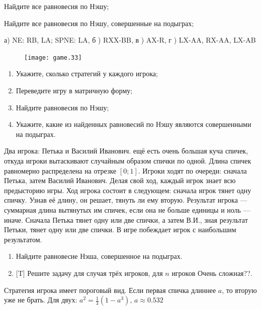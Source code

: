 \begin{problem}
Найдите все равновесия по Нэшу;\par
Найдите все равновесия по Нэшу, совершенные на подыграх;



\begin{sol}
 а)  NE: RB, LA; SPNE: LA, б ) RXX-BB, в ) AX-R, г ) LX-AA, RX-AA, LX-AB
\end{sol}
\end{problem}



\begin{problem}
\begin{figure}[htbp]
     \texttt{[image: game.33]}
\end{figure}\par

\begin{enumerate}
\item  Укажите, сколько стратегий у каждого игрока;\par
\item Переведите игру в матричную форму;\par
\item Найдите равновесия по Нэшу;\par
\item Укажите, какие из найденных равновесий по Нэшу являются совершенными на подыграх.
\end{enumerate}
\begin{sol}
\end{sol}
\end{problem}





\begin{problem}
Два игрока: Петька и Василий Иванович. ещё есть очень большая куча спичек, откуда игроки вытаскивают случайным образом спички по одной. Длина спичек равномерно распределена на отрезке $[0;1]$. Игроки ходят по очереди: сначала Петька, затем Василий Иванович. Делая свой ход, каждый игрок знает всю предысторию игры. Ход игрока состоит в следующем: сначала игрок тянет одну спичку. Узнав её длину, он решает, тянуть ли ему вторую. Результат игрока — суммарная длина вытянутых им спичек, если она не больше единицы и ноль — иначе. Сначала Петька тянет одну или две спички, а затем В.И., зная результат Петьки, тянет одну или две спички. В игре побеждает игрок с наибольшим результатом.
\begin{enumerate}
\item Найдите равновесие Нэша, совершенное на подыграх.
\item $[$T] Решите задачу для случая трёх игроков, для $n$ игроков {\red Очень сложная??}.
\end{enumerate}




\begin{sol}
Стратегия игрока имеет пороговый вид. Если первая спичка длиннее $a$, то вторую уже не брать. Для двух: $a^{2}=\frac{1}{3}(1-a^{3})$, $a\approx 0.532$
\end{sol}
\end{problem}


